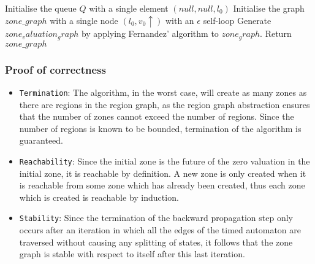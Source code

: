\documentclass[a4paper]{llncs}
\begin{document}
\begin{algorithm2e}[H]
  Initialise the queue $Q$ with a single element $(null, null, l_0)$\;
  Initialise the graph $zone\_graph$ with a single node $(l_0, v_0 \uparrow)$
  with an $\epsilon$ self-loop\;
  Generate $zone_valuation_graph$ by applying Fernandez' algorithm to $zone_graph$.
  Return $zone\_graph$\;
\end{algorithm2e}

\subsubsection{Proof of correctness}

\begin{itemize}

\item \texttt{Termination}: The algorithm, in the worst case,
  will create as many zones as there are regions in the region graph,
  as the region graph abstraction ensures that the number of zones
  cannot exceed the number of regions. Since the number of regions is
  known to be bounded, termination of the algorithm is
  guaranteed.

\item \texttt{Reachability}: Since the initial zone is the future of
  the zero valuation in the initial zone, it is reachable by
  definition. A new zone is only created when it is reachable from some
  zone which has already been created, thus each zone which is created
  is reachable by induction.

\item \texttt{Stability}: Since the termination of the backward
  propagation step only occurs after an iteration in which all the
  edges of the timed automaton are traversed without causing any
  splitting of states, it follows that the zone graph is stable with
  respect to itself after this last iteration.

\end{itemize}
\end{document}
